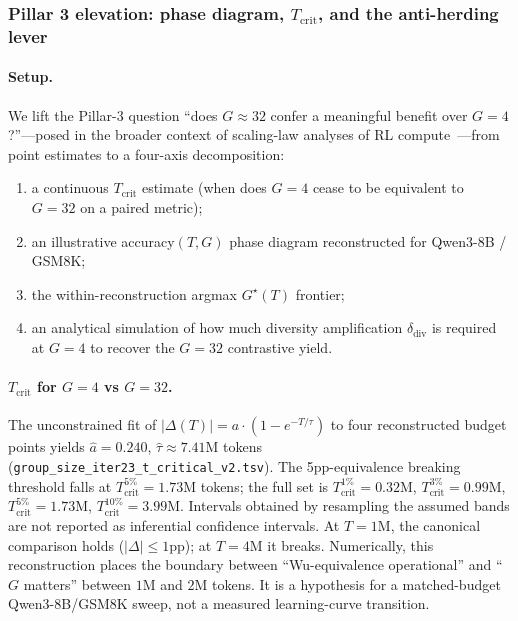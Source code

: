 
\subsubsection{Pillar 3 elevation: phase diagram, \texorpdfstring{$T_\text{crit}$}{T\_crit}, and the anti-herding lever}
\label{sec:pillar3-iter23}

\paragraph{Setup.}
We lift the Pillar-3 question ``does $G\!\approx\!32$ confer a meaningful
benefit over $G\!=\!4$?''---posed in the broader context of scaling-law
analyses of RL compute~\cite{tan2025scalingrl}---from point estimates to a
four-axis decomposition:
\begin{enumerate}\itemsep1pt
\item a continuous $T_\text{crit}$ estimate (when does $G\!=\!4$ cease to be
      equivalent to $G\!=\!32$ on a paired metric);
\item an illustrative accuracy$(T, G)$ phase diagram reconstructed for
      Qwen3-8B / GSM8K;
\item the within-reconstruction argmax $G^\star(T)$ frontier;
\item an analytical simulation of how much diversity amplification
      $\delta_\text{div}$ is required at $G\!=\!4$ to recover the
      $G\!=\!32$ contrastive yield.
\end{enumerate}

\paragraph{$T_\text{crit}$ for $G=4$ vs $G=32$.}
The unconstrained fit of $|\Delta(T)| = a \cdot (1 - e^{-T/\tau})$ to four
reconstructed budget points yields $\hat a=0.240$,
$\hat\tau \!\approx\! 7.41$M tokens
(\texttt{group\_size\_iter23\_t\_critical\_v2.tsv}).
The 5pp-equivalence breaking threshold falls at
$T_\text{crit}^{5\%}\!=\!1.73$M tokens; the full set is
$T_\text{crit}^{1\%}\!=\!0.32$M, $T_\text{crit}^{3\%}\!=\!0.99$M,
$T_\text{crit}^{5\%}\!=\!1.73$M, $T_\text{crit}^{10\%}\!=\!3.99$M.
Intervals obtained by resampling the assumed bands are not reported as
inferential confidence intervals.  At $T\!=\!1$M, the canonical
comparison holds ($|\Delta|\!\le\!1$pp); at $T\!=\!4$M it breaks.
Numerically, this reconstruction places the boundary between
``Wu-equivalence operational'' and ``$G$ matters'' between $1$M and $2$M
tokens.  It is a hypothesis for a matched-budget Qwen3-8B/GSM8K sweep, not a
measured learning-curve transition.

